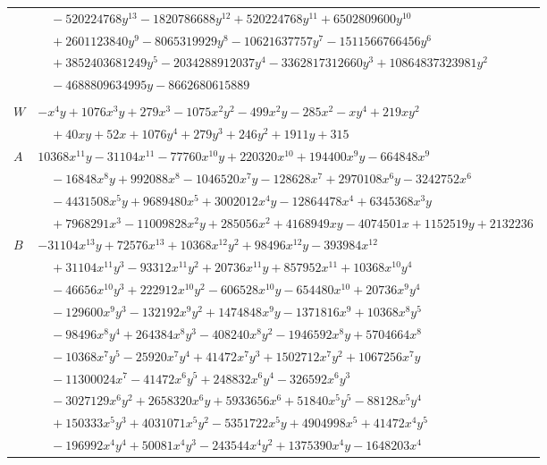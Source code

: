 \documentclass[11pt]{article}
\begin{document}
\begin{longtable}{@{}ll@{}}
 & $\quad -520224768y^{13}-1820786688y^{12}+520224768y^{11}+6502809600y^{10}$\\
 & $\quad +2601123840y^{9}-8065319929y^{8}-10621637757y^{7}-1511566766456y^{6}$\\
 & $\quad +3852403681249y^{5}-2034288912037y^{4}-3362817312660y^{3}+10864837323981y^{2}$\\
 & $\quad -4688809634995y-8662680615889$\\
\addlinespace[3pt]
\multicolumn{2}{@{}l}{$i=43$, $m=72$, neighbours $8,13,41,57,61,95,114,168,181$}\\
$W$ & $-x^{4}y+1076x^{3}y+279x^{3}-1075x^{2}y^{2}-499x^{2}y-285x^{2}-xy^{4}+219xy^{2}$\\
 & $\quad +40xy+52x+1076y^{4}+279y^{3}+246y^{2}+1911y+315$\\
$A$ & $10368x^{11}y-31104x^{11}-77760x^{10}y+220320x^{10}+194400x^{9}y-664848x^{9}$\\
 & $\quad -16848x^{8}y+992088x^{8}-1046520x^{7}y-128628x^{7}+2970108x^{6}y-3242752x^{6}$\\
 & $\quad -4431508x^{5}y+9689480x^{5}+3002012x^{4}y-12864478x^{4}+6345368x^{3}y$\\
 & $\quad +7968291x^{3}-11009828x^{2}y+285056x^{2}+4168949xy-4074501x+1152519y+2132236$\\
$B$ & $-31104x^{13}y+72576x^{13}+10368x^{12}y^{2}+98496x^{12}y-393984x^{12}$\\
 & $\quad +31104x^{11}y^{3}-93312x^{11}y^{2}+20736x^{11}y+857952x^{11}+10368x^{10}y^{4}$\\
 & $\quad -46656x^{10}y^{3}+222912x^{10}y^{2}-606528x^{10}y-654480x^{10}+20736x^{9}y^{4}$\\
 & $\quad -129600x^{9}y^{3}-132192x^{9}y^{2}+1474848x^{9}y-1371816x^{9}+10368x^{8}y^{5}$\\
 & $\quad -98496x^{8}y^{4}+264384x^{8}y^{3}-408240x^{8}y^{2}-1946592x^{8}y+5704664x^{8}$\\
 & $\quad -10368x^{7}y^{5}-25920x^{7}y^{4}+41472x^{7}y^{3}+1502712x^{7}y^{2}+1067256x^{7}y$\\
 & $\quad -11300024x^{7}-41472x^{6}y^{5}+248832x^{6}y^{4}-326592x^{6}y^{3}$\\
 & $\quad -3027129x^{6}y^{2}+2658320x^{6}y+5933656x^{6}+51840x^{5}y^{5}-88128x^{5}y^{4}$\\
 & $\quad +150333x^{5}y^{3}+4031071x^{5}y^{2}-5351722x^{5}y+4904998x^{5}+41472x^{4}y^{5}$\\
 & $\quad -196992x^{4}y^{4}+50081x^{4}y^{3}-243544x^{4}y^{2}+1375390x^{4}y-1648203x^{4}$\\

\end{longtable}
\end{document}

